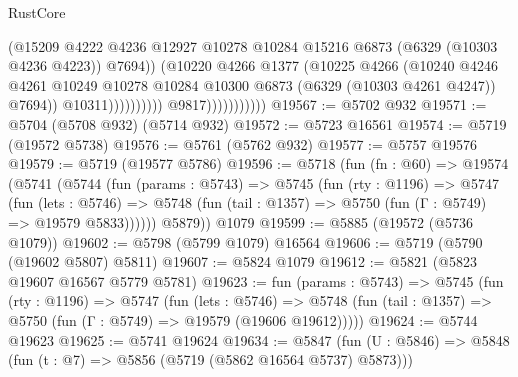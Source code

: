 \begin{lexlean}{RustCore}
\begin{coremodule}
                                              (@15209
                                                @4222
                                                @4236
                                                @12927
                                                @10278
                                                @10284
                                                @15216
                                                @6873
                                                (@6329 (@10303 @4236 @4223))
                                                @7694))
                                            (@10220
                                              @4266
                                              @1377
                                              (@10225
                                                @4266
                                                (@10240
                                                  @4246
                                                  @4261
                                                  @10249
                                                  @10278
                                                  @10284
                                                  @10300
                                                  @6873
                                                  (@6329 (@10303 @4261 @4247))
                                                  @7694))
                                              @10311))))))))))
                          @9817)))))))))))
@19567 := @5702 @932
@19571 := @5704 (@5708 @932) (@5714 @932)
@19572 := @5723 @16561
@19574 := @5719 (@19572 @5738)
@19576 := @5761 (@5762 @932)
@19577 := @5757 @19576
@19579 := @5719 (@19577 @5786)
@19596 := @5718
    (fun (fn : @60) =>
    @19574
      (@5741
        (@5744
          (fun (params : @5743) =>
          @5745
            (fun (rty : @1196) =>
            @5747
              (fun (lets : @5746) =>
              @5748 (fun (tail : @1357) => @5750 (fun (Γ : @5749) => @19579 @5833))))))
        @5879))
    @1079
@19599 := @5885 (@19572 (@5736 @1079))
@19602 := @5798 (@5799 @1079) @16564
@19606 := @5719 (@5790 (@19602 @5807) @5811)
@19607 := @5824 @1079
@19612 := @5821 (@5823 @19607 @16567 @5779 @5781)
@19623 := fun (params : @5743) =>
  @5745
    (fun (rty : @1196) =>
    @5747
      (fun (lets : @5746) =>
      @5748 (fun (tail : @1357) => @5750 (fun (Γ : @5749) => @19579 (@19606 @19612)))))
@19624 := @5744 @19623
@19625 := @5741 @19624
@19634 := @5847
    (fun (U : @5846) => @5848 (fun (t : @7) => @5856 (@5719 (@5862 @16564 @5737) @5873)))

\end{coremodule}
\end{lexlean}
